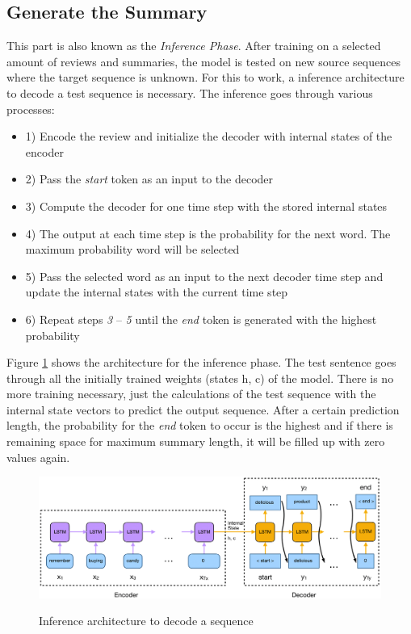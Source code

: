 \subsection{Generate the Summary}\label{ss:generate}

This part is also known as the \textit{Inference Phase}. After training on a selected amount of reviews and summaries, the model is tested on new source sequences where the target sequence is unknown. For this to work,  a inference architecture to decode a test sequence is necessary. The inference goes through various processes:

\begin{itemize}
	\item 1) Encode the review and initialize the decoder with internal states of the encoder
	\item 2) Pass the \textit{start} token as an input to the decoder
	\item 3) Compute the decoder for one time step with the stored internal states
	\item 4) The output at each time step is the probability for the next word. The maximum probability word will be selected
	\item 5) Pass the selected word as an input to the next decoder time step and update the internal states with the current time step
	\item 6) Repeat steps \textit{3} – \textit{5} until the \textit{end} token is generated with the highest probability
\end{itemize}

Figure \ref{infer} shows the architecture for the inference phase. The test sentence goes through all the initially trained weights (states h, c) of the model. There is no more training necessary, just the calculations of the test sequence with the internal state vectors to predict the output sequence. After a certain prediction length, the probability for the \textit{end} token to occur is the highest and if there is remaining space for maximum summary length, it will be filled up with zero values again. 

\begin{figure}
	\begin{center}
		\includegraphics[width=5in]{photos/infer-1}\\
		\caption{Inference architecture to decode a sequence}\label{infer}
	\end{center}
\end{figure}

